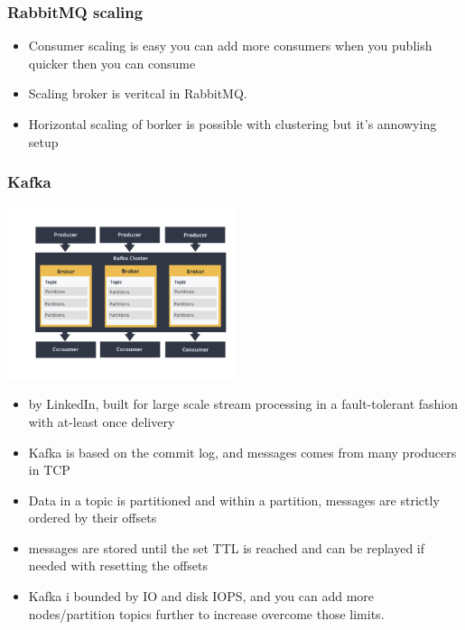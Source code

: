 \documentclass[12pt]{beamer}
\begin{document}
        \begin{frame}
            \begin{center}
                \frametitle{RabbitMQ scaling}
                \begin{itemize}
                    \item Consumer scaling is easy you can add more consumers when you publish quicker then you can consume
                    \item Scaling broker is veritcal in RabbitMQ.
                    \item Horizontal scaling of borker is possible with clustering but it's annowying setup
                \end{itemize}
            \end{center}
        \end{frame}

        \begin{frame}
            \begin{center}
                \frametitle{Kafka}
                \includegraphics[width=0.5\textwidth]{images/kafka}
                \begin{itemize}
                    \item by LinkedIn, built for large scale stream processing in a fault-tolerant fashion with at-least once delivery
                    \item Kafka is based on the commit log, and messages comes from many producers in TCP
                    \item Data in a topic is partitioned and within a partition, messages are strictly ordered by their offsets
                    \item messages are stored until the set TTL is reached and can be replayed if needed with resetting the offsets
                    \item Kafka i bounded by IO and disk IOPS, and you can add more nodes/partition topics further to increase overcome those limits.
                \end{itemize}
            \end{center}
        \end{frame}
\end{document}
